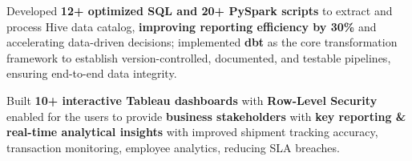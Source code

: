 \documentclass[letterpaper,6pt]{article}
\newcommand{\resumeItem}[1]{
  \item\footnotesize{
    {#1 \vspace{-2pt}}
  }
}
\begin{document}
            \resumeItem{Developed \textbf{12+ optimized SQL and 20+ PySpark scripts} to extract and process Hive data catalog, \textbf{improving reporting efficiency by 30\%} and accelerating data-driven decisions; implemented \textbf{dbt} as the core transformation framework to establish version-controlled, documented, and testable pipelines, ensuring end-to-end data integrity.}
            

            

                    
            \resumeItem{Built \textbf{10+ interactive Tableau dashboards} with \textbf{Row-Level Security} enabled for the users to provide \textbf{business stakeholders} with \textbf{key reporting \& real-time analytical insights} with improved shipment tracking accuracy, transaction monitoring, employee analytics,  reducing SLA breaches.}
            
            
\end{document}
